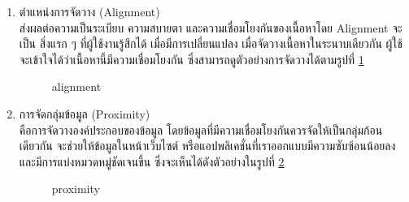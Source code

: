 \documentclass[14pt,oneside,openright,a4paper]{cpe-thai-project}
\begin{document}
\begin{enumerate}
    \newpage

    \item ตำแหน่งการจัดวาง (Alignment)\\
    ส่งผลต่อความเป็นระเบียบ ความสบายตา และความเชื่อมโยงกันของเนื้อหาโดย Alignment จะเป็น สิ่งแรก ๆ ที่ผู้ใช้งานรู้สึกได้ เมื่อมีการเปลี่ยนแปลง เมื่อจัดวางเนื้อหาในระนาบเดียวกัน ผู้ใช้จะเข้าใจได้ว่าเนื้อหานี้มีความเชื่อมโยงกัน ซึ่งสามารถดูตัวอย่างการจัดวางได้ตามรูปที่ \ref{fig:alignment}
    
    \begin{figure}[!h]\centering
      \setlength{\fboxrule}{0.5mm} %
      \setlength{\fboxsep}{0.5cm}
      \caption{alignment \cite{Alignment}}\label{fig:alignment}
    \end{figure}

    \item การจัดกลุ่มข้อมูล (Proximity) \\
    คือการจัดวางองค์ประกอบของข้อมูล โดยข้อมูลที่มีความเชื่อมโยงกันควรจัดให้เป็นกลุ่มก้อนเดียวกัน จะช่วยให้ข้อมูลในหน้าเว็บไซต์ หรือแอปพลิเคชั่นที่เราออกแบบมีความซับซ้อนน้อยลง และมีการแบ่งหมวดหมู่ชัดเจนขึ้น ซึ่งจะเห็นได้ดังตัวอย่างในรูปที่ \ref{fig:proximity}
    
    \begin{figure}[!h]\centering
      \setlength{\fboxrule}{0.5mm} %
      \setlength{\fboxsep}{0.5cm}
      \caption{proximity \cite{Proximity}}\label{fig:proximity}
    \end{figure}
  \end{enumerate}
\end{document}
